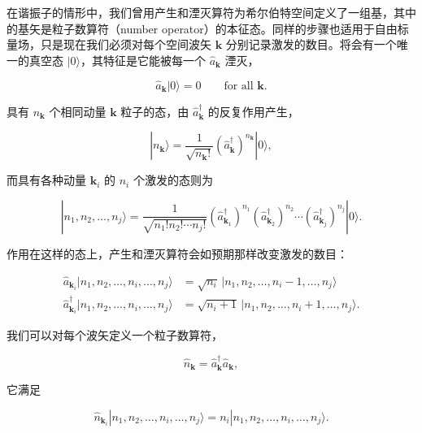 在谐振子的情形中，我们曾用产生和湮灭算符为希尔伯特空间定义了一组基，其中的基矢是粒子数算符（number operator）的本征态。同样的步骤也适用于自由标量场，只是现在我们必须对每个空间波矢 $\mathbf{k}$ 分别记录激发的数目。将会有一个唯一的真空态 $|0\rangle$，其特征是它能被每一个 $\hat{a}_{\mathbf{k}}$ 湮灭，

\begin{equation*}
\hat{a}_{\mathbf{k}}|0\rangle = 0 \qquad \text{for all } \mathbf{k}.
\tag{9.68}
\end{equation*}

具有 $n_{\mathbf{k}}$ 个相同动量 $\mathbf{k}$ 粒子的态，由 $\hat{a}^{\dagger}_{\mathbf{k}}$ 的反复作用产生，

\begin{equation*}
|n_{\mathbf{k}}\rangle = \frac{1}{\sqrt{n_{\mathbf{k}}!}}\left(\hat{a}^{\dagger}_{\mathbf{k}}\right)^{n_{\mathbf{k}}}|0\rangle,
\tag{9.69}
\end{equation*}

而具有各种动量 $\mathbf{k}_i$ 的 $n_i$ 个激发的态则为

\begin{equation*}
|n_1, n_2, \ldots, n_j\rangle = \frac{1}{\sqrt{n_1!n_2!\cdots n_j!}}\left(\hat{a}^{\dagger}_{\mathbf{k}_1}\right)^{n_1}\left(\hat{a}^{\dagger}_{\mathbf{k}_2}\right)^{n_2}\cdots\left(\hat{a}^{\dagger}_{\mathbf{k}_j}\right)^{n_j}|0\rangle.
\tag{9.70}
\end{equation*}

作用在这样的态上，产生和湮灭算符会如预期那样改变激发的数目：

\begin{align*}
\hat{a}_{\mathbf{k}_i}|n_1, n_2, \ldots, n_i, \ldots, n_j\rangle &= \sqrt{n_i}\,|n_1, n_2, \ldots, n_i-1, \ldots, n_j\rangle \\
\hat{a}^{\dagger}_{\mathbf{k}_i}|n_1, n_2, \ldots, n_i, \ldots, n_j\rangle &= \sqrt{n_i+1}\,|n_1, n_2, \ldots, n_i+1, \ldots, n_j\rangle.
\tag{9.71}
\end{align*}

我们可以对每个波矢定义一个粒子数算符，

\begin{equation*}
\hat{n}_{\mathbf{k}} = \hat{a}^{\dagger}_{\mathbf{k}}\hat{a}_{\mathbf{k}},
\tag{9.72}
\end{equation*}

它满足

\begin{equation*}
\hat{n}_{\mathbf{k}_i}|n_1, n_2, \ldots, n_i, \ldots, n_j\rangle = n_i|n_1, n_2, \ldots, n_i, \ldots, n_j\rangle.
\tag{9.73}
\end{equation*}

